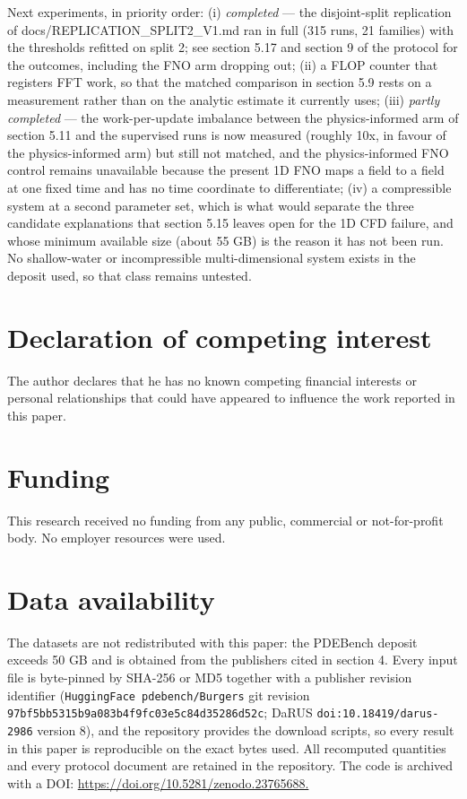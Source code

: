 \documentclass[preprint,12pt]{elsarticle}
\begin{document}
Next experiments, in priority order: (i) \emph{completed} --- the disjoint-split replication of docs/REPLICATION\_SPLIT2\_V1.md ran in full (315 runs, 21 families) with the thresholds refitted on split 2; see section 5.17 and section 9 of the protocol for the outcomes, including the FNO arm dropping out; (ii) a FLOP counter that registers FFT work, so that the matched comparison in section 5.9 rests on a measurement rather than on the analytic estimate it currently uses; (iii) \emph{partly completed} --- the work-per-update imbalance between the physics-informed arm of section 5.11 and the supervised runs is now measured (roughly 10x, in favour of the physics-informed arm) but still not matched, and the physics-informed FNO control remains unavailable because the present 1D FNO maps a field to a field at one fixed time and has no time coordinate to differentiate; (iv) a compressible system at a second parameter set, which is what would separate the three candidate explanations that section 5.15 leaves open for the 1D CFD failure, and whose minimum available size (about 55 GB) is the reason it has not been run. No shallow-water or incompressible multi-dimensional system exists in the deposit used, so that class remains untested.





\section*{Declaration of competing interest}

The author declares that he has no known competing financial interests or personal relationships that could have appeared to influence the work reported in this paper.

\section*{Funding}

This research received no funding from any public, commercial or not-for-profit body. No employer resources were used.

\section*{Data availability}

The datasets are not redistributed with this paper: the PDEBench deposit exceeds 50 GB and is obtained from the publishers cited in section 4. Every input file is byte-pinned by SHA-256 or MD5 together with a publisher revision identifier (\texttt{HuggingFace pdebench/Burgers} git revision \texttt{97bf5bb5315b9a083b4f9fc03e5c84d35286d52c}; DaRUS \texttt{doi:10.18419/darus-2986} version 8), and the repository provides the download scripts, so every result in this paper is reproducible on the exact bytes used. All recomputed quantities and every protocol document are retained in the repository. The code is archived with a DOI: \url{https://doi.org/10.5281/zenodo.23765688.}
\end{document}
